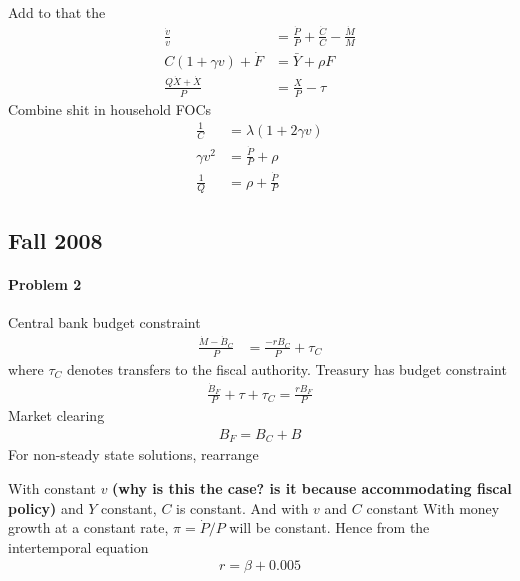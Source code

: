 \documentclass[12pt]{article}
\theoremstyle{plain}
\theoremstyle{definition}
\theoremstyle{remark}
\begin{document}
Add to that the
\begin{align*}
  \frac{\dot{v}}{v}
  &=
  \frac{\dot{P}}{P}
  + \frac{\dot{C}}{C}
  - \frac{\dot{M}}{M}
  \\
  C (1+\gamma v)
  + \dot{F}
  &= \bar{Y} + \rho F
  \\
  \frac{Q\dot{X}+\dot{X}}{P}
  &=
  \frac{X}{P}
  -\tau
\end{align*}
Combine shit in household FOCs
\begin{align*}
  \frac{1}{C}
  &=
    \lambda
    \left(
    1+2\gamma v
    \right)
  \\
  \gamma v^2
  &=
  \frac{\dot{P}}{P}
  +\rho
  \\
  \frac{1}{Q}
  &=
  \rho
  +
  \frac{\dot{P}}{P}
\end{align*}










\clearpage
\subsection{Fall 2008}

\paragraph{Problem 2}
Central bank budget constraint
\begin{align*}
  \frac{\dot{M}-\dot{B}_C}{P}
  &=
  \frac{-rB_C}{P}
  +\tau_C
\end{align*}
where $\tau_C$ denotes transfers to the fiscal authority.
Treasury has budget constraint
\begin{align*}
  \frac{\dot{B}_F}{P}
  +\tau +\tau_C =
  \frac{rB_F}{P}
\end{align*}
Market clearing
\begin{align*}
  B_F = B_C + B
\end{align*}
For non-steady state solutions, rearrange


With constant $v$ \textbf{(why is this the case? is it because
accommodating fiscal policy)} and $Y$ constant, $C$
is constant.
And with $v$ and $C$ constant
With money growth at a constant rate, $\pi=\dot{P}/P$ will be constant.
Hence from the intertemporal equation
\begin{align*}
  r = \beta + 0.005
\end{align*}
\end{document}
